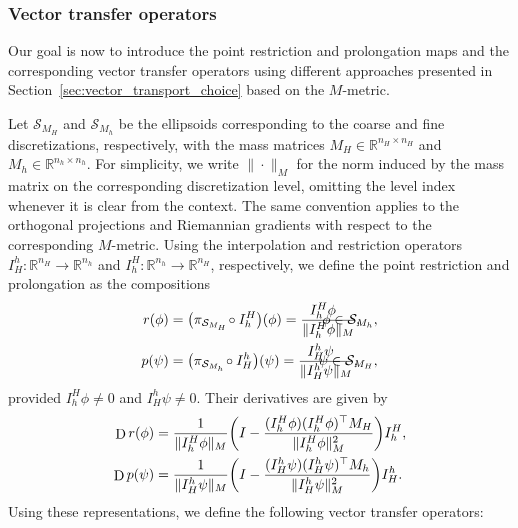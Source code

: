 \documentclass[11pt,reqno]{amsart}
\theoremstyle{plain}
\newcommand\R{\mathbb R}
\DeclareMathOperator{\Drm}{D}
\def\restr{r}
\def\prol{p}
\newcommand\calS{\mathcal S}
\begin{document}
	\subsubsection{Vector transfer operators} 
	\label{sssec:GP_VectorTransports}
	
	Our goal is now to introduce the point restriction and prolongation maps and the corresponding vector transfer operators using different approaches presented in Section~\ref{sec:vector_transport_choice} based on the $M$-metric.
	
	Let $\calS_{M_H}$ and $\calS_{M_h}$ be the ellipsoids corresponding to the coarse and fine discretizations, respectively, with the mass matrices $M_H\in\R^{n_H\times n_H}$ and $M_h\in\R^{n_h\times n_h}$. For simplicity, we write $\|\cdot\|_M$ for the norm induced by the mass matrix on the corresponding discretization level, omitting the level index whenever it is clear from the context. The same convention applies to the orthogonal projections and Riemannian gradients with respect to the corresponding $M$-metric. Using the interpolation and restriction operators \mbox{$I_H^h:\mathbb{R}^{n_H}\rightarrow\mathbb{R}^{n_h}$} and \mbox{$I_h^H:\mathbb{R}^{n_h}\rightarrow\mathbb{R}^{n_H}$}, respectively, we define the point restriction and prolongation as the compositions 
	\begin{align}
		\restr(\phi)
		& =\big(\pi_{\calS_{M_H}}\!\circ I_h^H\big)(\phi)
		=\frac{I_h^H\phi\enskip\;}{\|I_h^H\phi\|_{M}}, 
		& \hspace*{-15mm}\phi\in\calS_{M_h}, \label{eq:restrGP}\\
		\prol(\psi)
		& =\big(\pi_{\calS_{M_h}}\!\circ I_H^h\big)(\psi)
		= \frac{I_H^h\psi\enskip\;}{\|I_H^h\psi\|_{M}}, 
		& \hspace*{-14mm}\psi\in\calS_{M_H}, \notag
	\end{align}
	provided $I_h^H\phi\neq 0$ and $I_H^h\psi\neq 0$. Their derivatives are given by 
	\begin{align*}
		\Drm \restr(\phi) & =\frac{1}{\|I_h^H \phi\|_{M}}\bigg(I-\frac{(I_h^H \phi)(I_h^H \phi)^{\top}M_{H}}{\|I_h^H \phi\|_{M}^{2}}\bigg)I_h^H,\notag \\
		\Drm \prol(\psi) & =\frac{1}{\|I_H^h \psi\|_{M}}\bigg(I-\frac{(I_H^h \psi)(I_H^h \psi)^{\top}M_{h}}{\|I_H^h \psi\|_{M}^{2}}\bigg) I_H^h.
	\end{align*}
	Using these representations, we define the following vector transfer operators:
\end{document}
